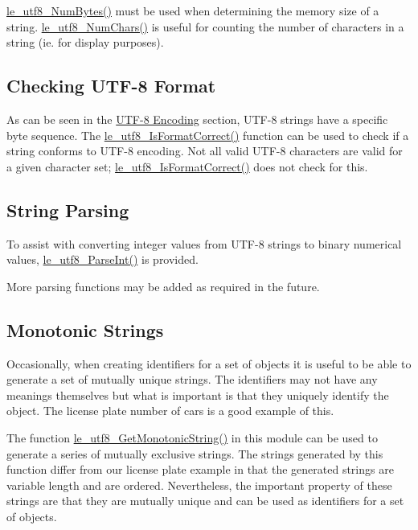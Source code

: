 {\ttfamily \hyperlink{le__utf8_8h_a2541a26cade8cef93db889194a430008}{le\+\_\+utf8\+\_\+\+Num\+Bytes()}} must be used when determining the memory size of a string. {\ttfamily \hyperlink{le__utf8_8h_af8f61f1aa523b03d02d6a89cb61449e2}{le\+\_\+utf8\+\_\+\+Num\+Chars()}} is useful for counting the number of characters in a string (ie. for display purposes).\hypertarget{c_utf8_utf8_format}{}\subsection{Checking U\+T\+F-\/8 Format}\label{c_utf8_utf8_format}
As can be seen in the \hyperlink{c_utf8_utf8_encoding}{U\+T\+F-\/8 Encoding} section, U\+T\+F-\/8 strings have a specific byte sequence. The {\ttfamily \hyperlink{le__utf8_8h_acffd959e1c6dcf9841217c1c0f6d09e5}{le\+\_\+utf8\+\_\+\+Is\+Format\+Correct()}} function can be used to check if a string conforms to U\+T\+F-\/8 encoding. Not all valid U\+T\+F-\/8 characters are valid for a given character set; \hyperlink{le__utf8_8h_acffd959e1c6dcf9841217c1c0f6d09e5}{le\+\_\+utf8\+\_\+\+Is\+Format\+Correct()} does not check for this.\hypertarget{c_utf8_utf8_parsing}{}\subsection{String Parsing}\label{c_utf8_utf8_parsing}
To assist with converting integer values from U\+T\+F-\/8 strings to binary numerical values, \hyperlink{le__utf8_8h_a680a92fafea1ed72dedb80b52be32a06}{le\+\_\+utf8\+\_\+\+Parse\+Int()} is provided.

More parsing functions may be added as required in the future.\hypertarget{c_utf8_utf8_monotonic}{}\subsection{Monotonic Strings}\label{c_utf8_utf8_monotonic}
Occasionally, when creating identifiers for a set of objects it is useful to be able to generate a set of mutually unique strings. The identifiers may not have any meanings themselves but what is important is that they uniquely identify the object. The license plate number of cars is a good example of this.

The function \hyperlink{le__utf8_8h_a84c9f386331804e20c756ef386ae03dd}{le\+\_\+utf8\+\_\+\+Get\+Monotonic\+String()} in this module can be used to generate a series of mutually exclusive strings. The strings generated by this function differ from our license plate example in that the generated strings are variable length and are ordered. Nevertheless, the important property of these strings are that they are mutually unique and can be used as identifiers for a set of objects.

